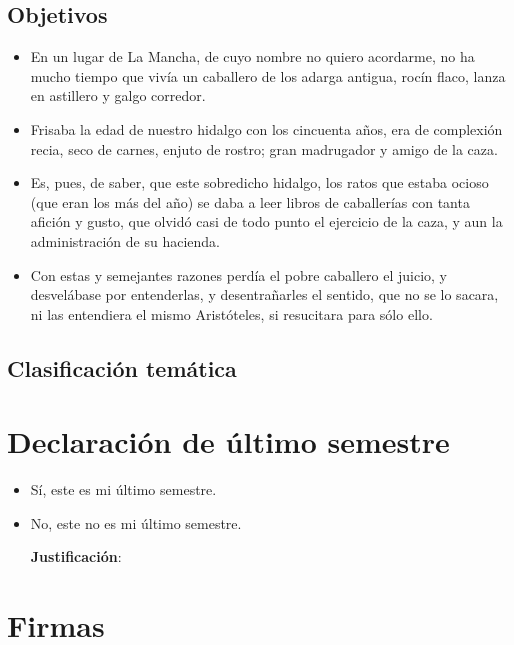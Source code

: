 \documentclass{anteproyecto}
\begin{document}
\subsection*{Objetivos}
\ifvacio
	\vspace{4cm}
\else
\begin{itemize}
\item En un lugar de La Mancha, de cuyo nombre no quiero acordarme, no ha mucho tiempo que vivía un caballero de los adarga antigua, rocín flaco, lanza en astillero y galgo corredor.
\item Frisaba la edad de nuestro hidalgo con los cincuenta años, era de complexión recia, seco de carnes, enjuto de rostro; gran madrugador y amigo de la caza.
\item Es, pues, de saber, que este sobredicho hidalgo, los ratos que estaba ocioso (que eran los más del año) se daba a leer libros de caballerías con tanta afición y gusto, que olvidó casi de todo punto el ejercicio de la caza, y aun la administración de su hacienda.
\item Con estas y semejantes razones perdía el pobre caballero el juicio, y desvelábase por entenderlas, y desentrañarles el sentido, que no se lo sacara, ni las entendiera el mismo Aristóteles, si resucitara para sólo ello.
\end{itemize}
\fi

\subsection*{Clasificación temática}
\ifvacio
	\vspace{1cm}
\else
   
\fi

\section*{Declaración de último semestre}

\begin{itemize}
\item[\seleccionar{}] Sí, este es mi último semestre.
\item[\seleccionar{}] No, este no es mi último semestre.

\textbf{Justificación}: 
\ifvacio
	\vspace{2cm}
\else
\lipsum[2]
\fi
\end{itemize}

\section*{Firmas}

\firmas

\newpage



\end{document}
